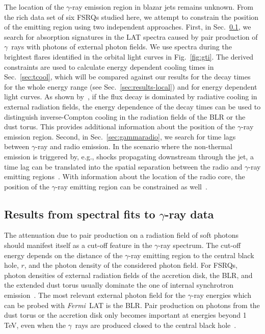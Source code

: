 \documentclass[twocolumn,linenumbers]{aastex62}
\newcommand{\Grays}{$\gamma$~rays\xspace}
\newcommand{\gray}{$\gamma$-ray\xspace}
\newcommand{\FermiLAT}{\emph{Fermi}~LAT\xspace}
\begin{document}
The location of the \gray emission region in blazar jets remains unknown. 
From the rich data set of six FSRQs studied here, we attempt to constrain the position of the emitting region using two independent approaches. 
First, in Sec.~\ref{sec:blrabs}, we search for absorption signatures in the LAT spectra caused by pair production of \Grays with photons of external photon fields. We use spectra during the brightest flares identified in the orbital light curves in Fig.~\ref{fig:gti}.
The derived constraints are used to calculate energy dependent cooling times in Sec.~\ref{sec:tcool}, which will be compared against our results for the decay times for the whole energy range (see Sec.~\ref{sec:results-local}) and for energy dependent light curves.
As shown by~\citet{2012ApJ...758L..15D}, if the flux decay is dominated by radiative cooling in external radiation fields, the energy dependence of the decay times can be used to distinguish inverse-Compton cooling in the radiation fields of the BLR or the dust torus.
This provides additional information about the position of the \gray emission region.
Second, in Sec.~\ref{sec:gammaradio}, we search for time lags between \gray and radio emission. 
In the scenario where the non-thermal emission is triggered by, e.g., shocks propagating downstream through the jet, a time lag can be translated into the spatial separation between the radio and \gray emitting regions~\citep{2014MNRAS.445..428M}. 
With information about the location of the radio core, the position of the \gray emitting region can be constrained as well~\citep[e.g.,][]{2014MNRAS.441.1899F}. 

\subsection{Results from spectral fits to \gray data}
\label{sec:blrabs}
The attenuation due to pair production on a radiation field of soft photons should manifest itself as a cut-off feature in the \gray spectrum. 
The cut-off energy depends on the distance of the \gray emitting region to the central black hole, $r$, and the photon density of the considered photon field.
For FSRQs, photon densities of external radiation fields of the accretion disk, the BLR, and the extended dust torus usually dominate the one of internal synchrotron emission~\citep[see,e.g.,][]{2012ApJ...758L..15D}.
The most relevant external photon field for the \gray energies which can be probed with \FermiLAT is the BLR. 
Pair production on photons from the dust torus or the accretion disk only becomes important at energies beyond 1\,TeV, even when the \Grays are produced closed to the central black hole~\citep{finke2016}.
\end{document}
